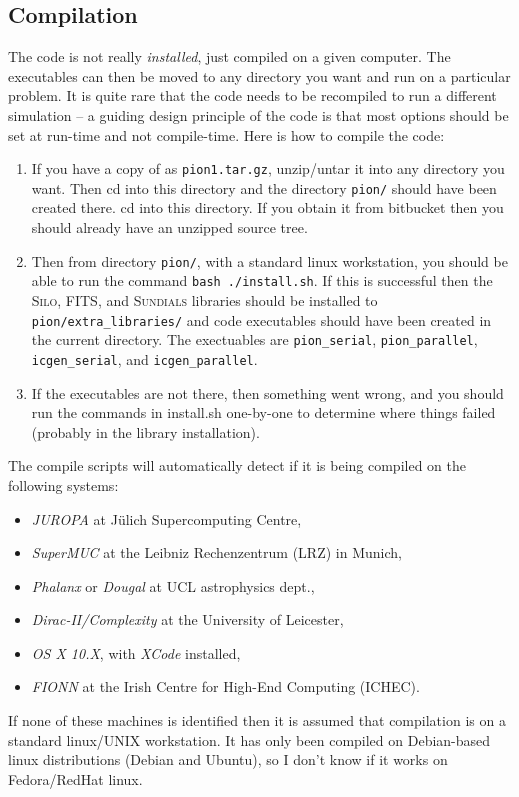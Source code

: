 \documentclass[a4paper,11pt]{report}
\begin{document}
\subsection{Compilation}
The code is not really \emph{installed}, just compiled on a given computer.
The executables can then be moved to any directory you want and run on a particular problem.
It is quite rare that the code needs to be recompiled to run a different simulation -- a guiding design principle of the code is that most options should be set at run-time and not compile-time.
Here is how to compile the code:
\begin{enumerate}
\item
  If you have a copy of \pion{} as \texttt{pion1.tar.gz}, unzip/untar it into any directory you want.
  Then cd into this directory and the directory \verb|pion/| should have been created there.  cd into this directory.
  If you obtain it from bitbucket then you should already have an unzipped source tree.
\item
  Then from directory \verb|pion/|, with a standard linux workstation, you should be able to run the command \verb|bash ./install.sh|.
  If this is successful then the \textsc{Silo}, \textsc{FITS}, and \textsc{Sundials} libraries should be installed to \verb|pion/extra_libraries/| and code executables should have been created in the current directory.
  The exectuables are \verb|pion_serial|, \verb|pion_parallel|, \verb|icgen_serial|, and \verb|icgen_parallel|.
\item
  If the executables are not there, then something went wrong, and you should run the commands in install.sh one-by-one to determine where things failed (probably in the library installation).
\end{enumerate}

The compile scripts will automatically detect if it is being compiled on the following systems:
\begin{itemize}
\item \emph{JUROPA} at J\"ulich Supercomputing Centre,
\item \emph{SuperMUC} at the Leibniz Rechenzentrum (LRZ) in Munich,
\item \emph{Phalanx} or \emph{Dougal} at UCL astrophysics dept.,
\item \emph{Dirac-II/Complexity} at the University of Leicester,
\item \emph{OS X 10.X}, with \emph{XCode} installed,
\item \emph{FIONN} at the Irish Centre for High-End Computing (ICHEC).
\end{itemize}
If none of these machines is identified then it is assumed that compilation is on a standard linux/UNIX workstation.
It has only been compiled on Debian-based linux distributions (Debian and Ubuntu), so I don't know if it works on Fedora/RedHat linux.
\end{document}
